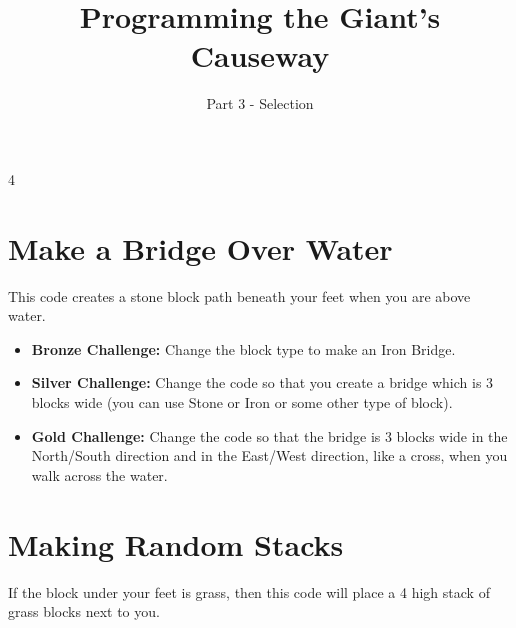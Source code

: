 \documentclass{geocraft-worksheet}
\begin{document}
\title{Programming the Giant's Causeway}
\subtitle{Part 3 - Selection}

\date{}

\maketitle



\setcounter {section} {4}

\section{Make a Bridge Over Water}\vspace{-0.5cm}
\lstset{language=Python}

\noindent%
%
\vspace{0.1cm}
%
%
\vspace{-0.1cm}
\noindent This code creates a stone block path beneath your feet when
you are above water.\vspace{-0.1cm}

\begin{itemize}
\item\textbf{Bronze Challenge:} Change the block type to make an Iron Bridge.

\item\textbf{Silver Challenge:} Change the code so that you create a
  bridge which is 3 blocks wide (you can use Stone or Iron or some
  other type of block).

\item\textbf{Gold Challenge:} Change the code so that the bridge is 3 blocks wide in the North/South direction
and in the East/West direction, like a cross, when you walk across the water.


\end{itemize}

\section{Making Random Stacks}\vspace{-0.5cm}

\noindent%
%
\vspace{0.1cm}
%
%
\vspace{-0.1cm}
\noindent If the block under your feet is grass, then this code will
place a 4 high stack of grass blocks next to you.\vspace{-0.1cm}
\end{document}
